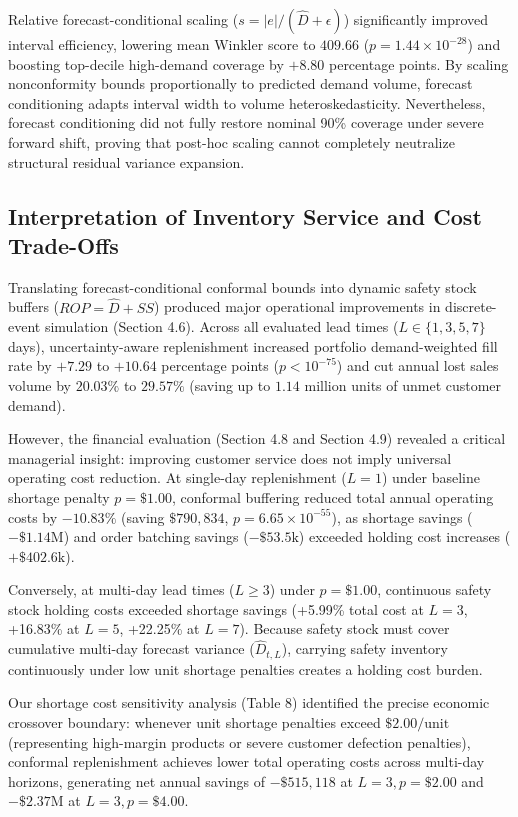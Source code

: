 Relative forecast-conditional scaling ($s = |e| / (\hat{D} + \epsilon)$) significantly improved interval efficiency, lowering mean Winkler score to $409.66$ ($p = 1.44 \times 10^{-28}$) and boosting top-decile high-demand coverage by $+8.80$ percentage points. By scaling nonconformity bounds proportionally to predicted demand volume, forecast conditioning adapts interval width to volume heteroskedasticity. Nevertheless, forecast conditioning did not fully restore nominal 90\% coverage under severe forward shift, proving that post-hoc scaling cannot completely neutralize structural residual variance expansion.

\subsection{Interpretation of Inventory Service and Cost Trade-Offs}
Translating forecast-conditional conformal bounds into dynamic safety stock buffers ($ROP = \hat{D} + SS$) produced major operational improvements in discrete-event simulation (Section 4.6). Across all evaluated lead times ($L \in \{1, 3, 5, 7\}$ days), uncertainty-aware replenishment increased portfolio demand-weighted fill rate by $+7.29$ to $+10.64$ percentage points ($p < 10^{-75}$) and cut annual lost sales volume by $20.03\%$ to $29.57\%$ (saving up to $1.14$ million units of unmet customer demand).

However, the financial evaluation (Section 4.8 and Section 4.9) revealed a critical managerial insight: improving customer service does not imply universal operating cost reduction. At single-day replenishment ($L=1$) under baseline shortage penalty $p=\$1.00$, conformal buffering reduced total annual operating costs by $-10.83\%$ (saving $\$790,834$, $p = 6.65 \times 10^{-55}$), as shortage savings ($-\$1.14\text{M}$) and order batching savings ($-\$53.5\text{k}$) exceeded holding cost increases ($+\$402.6\text{k}$).

Conversely, at multi-day lead times ($L \ge 3$) under $p=\$1.00$, continuous safety stock holding costs exceeded shortage savings (+5.99\% total cost at $L=3$, +16.83\% at $L=5$, +22.25\% at $L=7$). Because safety stock must cover cumulative multi-day forecast variance ($\hat{D}_{t,L}$), carrying safety inventory continuously under low unit shortage penalties creates a holding cost burden.

Our shortage cost sensitivity analysis (Table 8) identified the precise economic crossover boundary: whenever unit shortage penalties exceed $\$2.00/\text{unit}$ (representing high-margin products or severe customer defection penalties), conformal replenishment achieves lower total operating costs across multi-day horizons, generating net annual savings of $-\$515,118$ at $L=3, p=\$2.00$ and $-\$2.37\text{M}$ at $L=3, p=\$4.00$.

